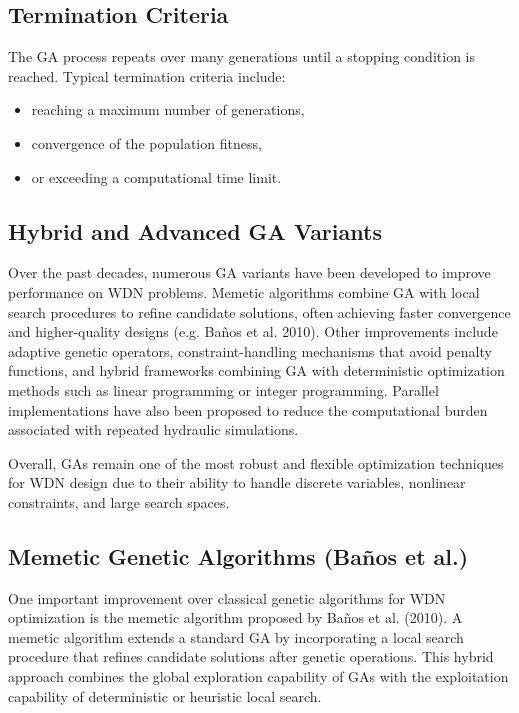 \documentclass[12pt, a4paper]{article}
\begin{document}
\subsection*{Termination Criteria}

The GA process repeats over many generations until a stopping condition is reached. Typical termination criteria include:

\begin{itemize}
	\item reaching a maximum number of generations,
	\item convergence of the population fitness,
	\item or exceeding a computational time limit.
\end{itemize}

\subsection*{Hybrid and Advanced GA Variants}

Over the past decades, numerous GA variants have been developed to improve performance on WDN problems. Memetic algorithms combine GA with local search procedures to refine candidate solutions, often achieving faster convergence and higher-quality designs (e.g. Baños et al. 2010)\cite{ref16}. Other improvements include adaptive genetic operators, constraint-handling mechanisms that avoid penalty functions, and hybrid frameworks combining GA with deterministic optimization methods such as linear programming or integer programming\cite{ref15}. Parallel implementations have also been proposed to reduce the computational burden associated with repeated hydraulic simulations.

Overall, GAs remain one of the most robust and flexible optimization techniques for WDN design due to their ability to handle discrete variables, nonlinear constraints, and large search spaces.

\subsection*{Memetic Genetic Algorithms (Ba\~nos et al.)}

One important improvement over classical genetic algorithms for WDN optimization is the memetic algorithm proposed by Ba\~nos et al. (2010)\cite{ref16}. A memetic algorithm extends a standard GA by incorporating a local search procedure that refines candidate solutions after genetic operations. This hybrid approach combines the global exploration capability of GAs with the exploitation capability of deterministic or heuristic local search.
\end{document}

